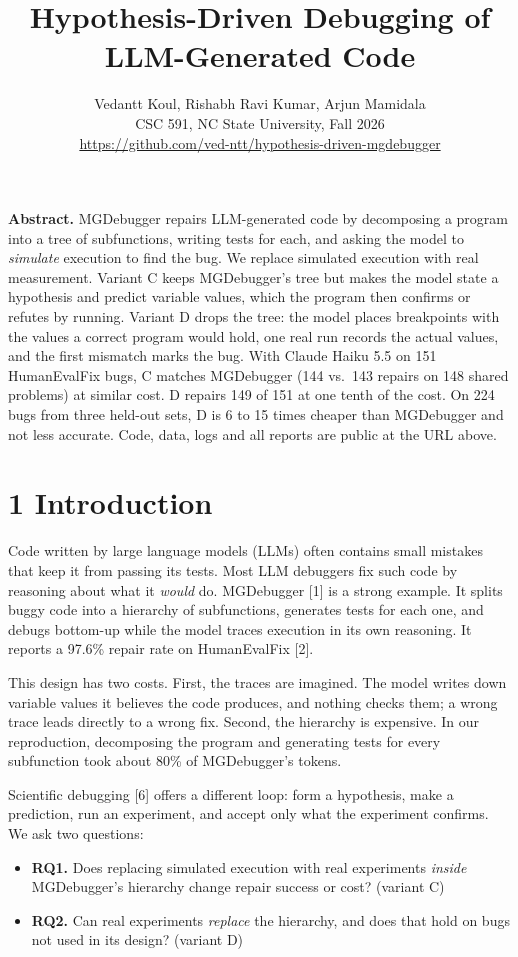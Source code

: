 \documentclass[
  10pt,
  twocolumn]{article}
\title{Hypothesis-Driven Debugging of LLM-Generated Code}
\author{Vedantt Koul, Rishabh Ravi Kumar, Arjun Mamidala\\
CSC 591, NC State University, Fall 2026\\
\url{https://github.com/ved-ntt/hypothesis-driven-mgdebugger}}
\date{}
\providecommand{\tightlist}{%
  \setlength{\itemsep}{0pt}\setlength{\parskip}{0pt}}
\begin{document}
\maketitle

\textbf{Abstract.} MGDebugger repairs LLM-generated code by decomposing
a program into a tree of subfunctions, writing tests for each, and
asking the model to \emph{simulate} execution to find the bug. We
replace simulated execution with real measurement. Variant C keeps
MGDebugger's tree but makes the model state a hypothesis and predict
variable values, which the program then confirms or refutes by running.
Variant D drops the tree: the model places breakpoints with the values a
correct program would hold, one real run records the actual values, and
the first mismatch marks the bug. With Claude Haiku 5.5 on 151
HumanEvalFix bugs, C matches MGDebugger (144 vs.~143 repairs on 148
shared problems) at similar cost. D repairs 149 of 151 at one tenth of
the cost. On 224 bugs from three held-out sets, D is 6 to 15 times
cheaper than MGDebugger and not less accurate. Code, data, logs and all
reports are public at the URL above.

\hypertarget{introduction}{%
\section{1 Introduction}\label{introduction}}

Code written by large language models (LLMs) often contains small
mistakes that keep it from passing its tests. Most LLM debuggers fix
such code by reasoning about what it \emph{would} do. MGDebugger {[}1{]}
is a strong example. It splits buggy code into a hierarchy of
subfunctions, generates tests for each one, and debugs bottom-up while
the model traces execution in its own reasoning. It reports a 97.6\%
repair rate on HumanEvalFix {[}2{]}.

This design has two costs. First, the traces are imagined. The model
writes down variable values it believes the code produces, and nothing
checks them; a wrong trace leads directly to a wrong fix. Second, the
hierarchy is expensive. In our reproduction, decomposing the program and
generating tests for every subfunction took about 80\% of MGDebugger's
tokens.

Scientific debugging {[}6{]} offers a different loop: form a hypothesis,
make a prediction, run an experiment, and accept only what the
experiment confirms. We ask two questions:

\begin{itemize}
\tightlist
\item
  \textbf{RQ1.} Does replacing simulated execution with real experiments
  \emph{inside} MGDebugger's hierarchy change repair success or cost?
  (variant C)
\item
  \textbf{RQ2.} Can real experiments \emph{replace} the hierarchy, and
  does that hold on bugs not used in its design? (variant D)
\end{itemize}
\end{document}

